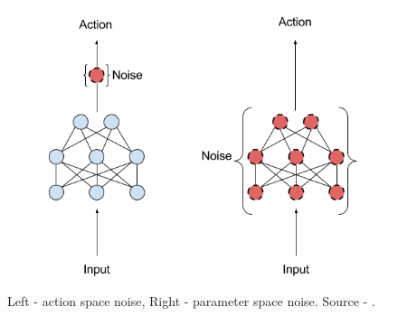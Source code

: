 \begin{figure}[H]
\centering
\includegraphics[scale=0.5]{fig/perturbations.png}
\caption[Exploration noise types]{Left - action space noise, Right - parameter space noise. Source - \cite{plappert2017}.}
\label{fig:exploration}
\end{figure}